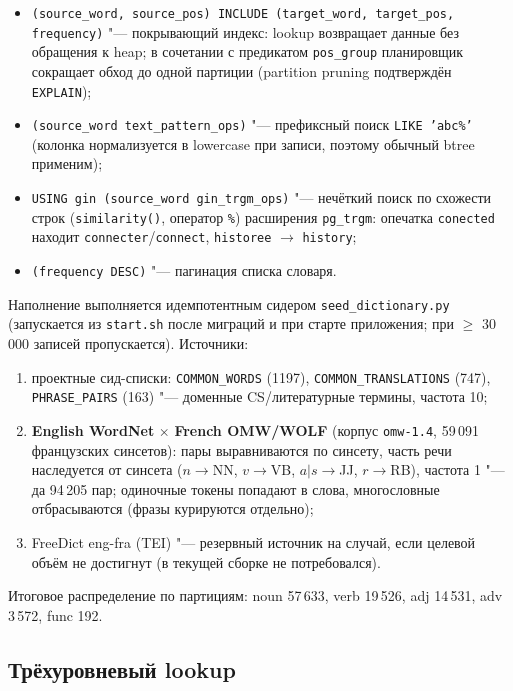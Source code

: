\begin{itemize}
	\item \texttt{(source\_word, source\_pos) INCLUDE (target\_word, target\_pos, frequency)} "---
	      покрывающий индекс: lookup возвращает данные без обращения к heap;
	      в сочетании с предикатом \texttt{pos\_group} планировщик сокращает
	      обход до одной партиции (partition pruning подтверждён \texttt{EXPLAIN});
	\item \texttt{(source\_word text\_pattern\_ops)} "--- префиксный поиск
	      \texttt{LIKE 'abc\%'} (колонка нормализуется в lowercase при записи,
	      поэтому обычный btree применим);
	\item \texttt{USING gin (source\_word gin\_trgm\_ops)} "--- нечёткий поиск
	      по схожести строк (\texttt{similarity()}, оператор \texttt{\%})
	      расширения \texttt{pg\_trgm}: опечатка \texttt{conected} находит
	      \texttt{connecter}/\texttt{connect}, \texttt{historee} $\to$ \texttt{history};
	\item \texttt{(frequency DESC)} "--- пагинация списка словаря.
\end{itemize}

Наполнение выполняется идемпотентным сидером \texttt{seed\_dictionary.py}
(запускается из \texttt{start.sh} после миграций и при старте приложения;
при $\geq$ 30\,000 записей пропускается). Источники:

\begin{enumerate}
	\item проектные сид-списки: \texttt{COMMON\_WORDS} (1197),
	      \texttt{COMMON\_TRANSLATIONS} (747), \texttt{PHRASE\_PAIRS} (163)
	      "--- доменные CS/литературные термины, частота 10;
	\item \textbf{English WordNet} $\times$ \textbf{French OMW/WOLF}
	      (корпус \texttt{omw-1.4}, 59\,091 французских синсетов): пары
	      выравниваются по синсету, часть речи наследуется от синсета
	      ($n{\to}$NN, $v{\to}$VB, $a|s{\to}$JJ, $r{\to}$RB), частота 1 "---
	      да 94\,205 пар; одиночные токены попадают в слова,
	      многословные отбрасываются (фразы курируются отдельно);
	\item FreeDict eng-fra (TEI) "--- резервный источник на случай,
	      если целевой объём не достигнут (в текущей сборке не потребовался).
\end{enumerate}

Итоговое распределение по партициям: noun 57\,633, verb 19\,526,
adj 14\,531, adv 3\,572, func 192.

\subsection{Трёхуровневый lookup}

